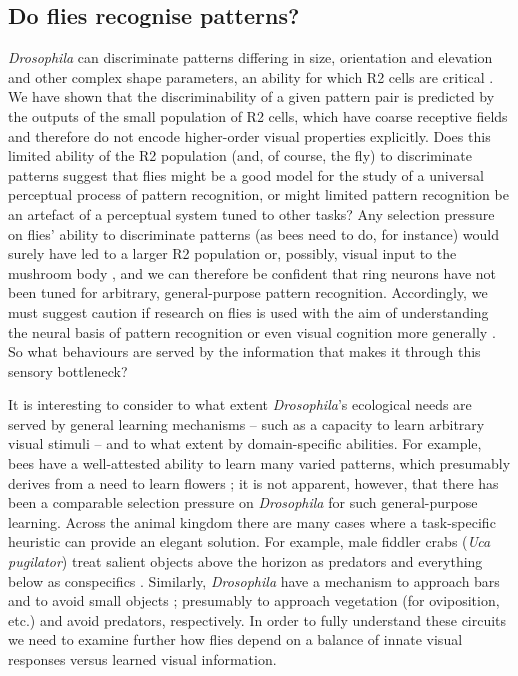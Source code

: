 \subsection*{Do flies recognise patterns?}
\emph{Drosophila} can discriminate patterns differing in size, orientation and elevation and other complex shape parameters, an ability for which R2 cells are critical \cite{Ernst1999,Liu2006,Pan2009}.
We have shown that the discriminability of a given pattern pair is predicted by the outputs of the small population of R2 cells, which have coarse receptive fields and therefore do not encode higher-order visual properties explicitly.
Does this limited ability of the R2 population (and, of course, the fly) to discriminate patterns suggest that flies might be a good model for the study of a universal perceptual process of pattern recognition, or might limited pattern recognition be an artefact of a perceptual system tuned to other tasks?
Any selection pressure on flies’ ability to discriminate patterns (as bees need to do, for instance) would surely have led to a larger R2 population or, possibly, visual input to the mushroom body \cite{Ehmer2002,Wolf1998}, and we can therefore be confident that ring neurons have not been tuned for arbitrary, general-purpose pattern recognition.
Accordingly, we must suggest caution if research on flies is used with the aim of understanding the neural basis of pattern recognition or even visual cognition more generally \cite{Menzel2001}.
So what behaviours are served by the information that makes it through this sensory bottleneck?

It is interesting to consider to what extent \emph{Drosophila}'s ecological needs are served by general learning mechanisms -- such as a capacity to learn arbitrary visual stimuli -- and to what extent by domain-specific abilities.
For example, bees have a well-attested ability to learn many varied patterns, which presumably derives from a need to learn flowers \cite{Gould1985}; it is not apparent, however, that there has been a comparable selection pressure on \emph{Drosophila} for such general-purpose learning.
Across the animal kingdom there are many cases where a task-specific heuristic can provide an elegant solution.
For example, male fiddler crabs (\emph{Uca pugilator}) treat salient objects above the horizon as predators and everything below as conspecifics \cite{Layne1997}.
Similarly, \emph{Drosophila} have a mechanism to approach bars and to avoid small objects \cite{Maimon2008}; presumably to approach vegetation (for oviposition, etc.) and avoid predators, respectively.
In order to fully understand these circuits we need to examine further how flies depend on a balance of innate visual responses versus learned visual information.

